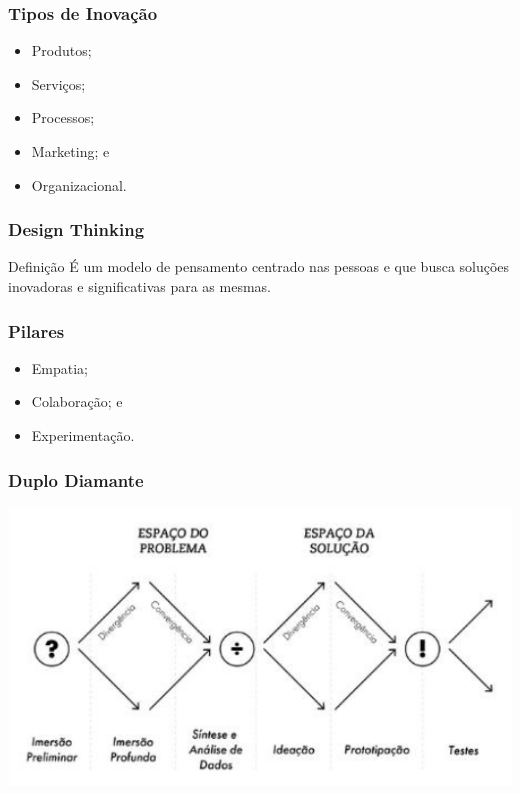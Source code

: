 \documentclass[aspectratio=169]{beamer}
\begin{document}
\begin{frame}
	\frametitle{Tipos de Inova\c cão}

	\begin{itemize}
		 \item Produtos;
		 \item Servi\c cos;
		 \item Processos;
		 \item Marketing; e
		 \item Organizacional.
	\end{itemize}
\end{frame}

\begin{frame}
	\frametitle{Design Thinking}

	\begin{block}{Defini\c cão}
		É um modelo de pensamento centrado nas pessoas e que busca soluções inovadoras e significativas para as mesmas.
	\end{block}
\end{frame}

\begin{frame}
	\frametitle{Pilares}

	\begin{itemize}
		\item Empatia;
		\item Colabora\c cão; e
		\item Experimenta\c cão.
	\end{itemize}
\end{frame}

\begin{frame}
	\frametitle{Duplo Diamante}
	
	\begin{center}
		\includegraphics[scale=0.5]{img/design_thinking}
	\end{center}
\end{frame}
\end{document}
